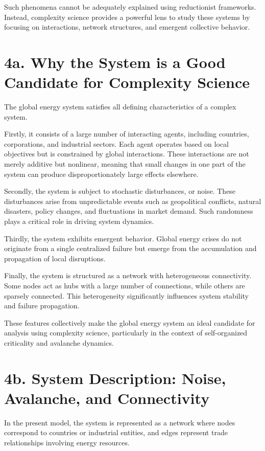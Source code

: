 \documentclass[12pt]{article}
\begin{document}
Such phenomena cannot be adequately explained using reductionist frameworks. Instead, complexity science provides a powerful lens to study these systems by focusing on interactions, network structures, and emergent collective behavior.

\section{4a. Why the System is a Good Candidate for Complexity Science}

The global energy system satisfies all defining characteristics of a complex system.

Firstly, it consists of a large number of interacting agents, including countries, corporations, and industrial sectors. Each agent operates based on local objectives but is constrained by global interactions. These interactions are not merely additive but nonlinear, meaning that small changes in one part of the system can produce disproportionately large effects elsewhere.

Secondly, the system is subject to stochastic disturbances, or noise. These disturbances arise from unpredictable events such as geopolitical conflicts, natural disasters, policy changes, and fluctuations in market demand. Such randomness plays a critical role in driving system dynamics.

Thirdly, the system exhibits emergent behavior. Global energy crises do not originate from a single centralized failure but emerge from the accumulation and propagation of local disruptions.

Finally, the system is structured as a network with heterogeneous connectivity. Some nodes act as hubs with a large number of connections, while others are sparsely connected. This heterogeneity significantly influences system stability and failure propagation.

These features collectively make the global energy system an ideal candidate for analysis using complexity science, particularly in the context of self-organized criticality and avalanche dynamics.

\section{4b. System Description: Noise, Avalanche, and Connectivity}

In the present model, the system is represented as a network where nodes correspond to countries or industrial entities, and edges represent trade relationships involving energy resources.
\end{document}
